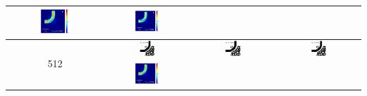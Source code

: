 \begin{table}[ht]
\begin{tabular}{|c|c|c|c|}
      \includegraphics[width=0.33\textwidth]{image/results/bend/PSO/visualize_field_disc_256.png} &
      \includegraphics[width=0.33\textwidth]{image/results/bend/PSO/visualize_field_fab_256.png} \\
    \hline
      \multirow{2}{*}{512} &
      \includegraphics[width=0.20\textwidth]{image/results/bend/PSO/visualize_eps_cont_512.png} &
      \includegraphics[width=0.20\textwidth]{image/results/bend/PSO/visualize_eps_disc_512.png} &
      \includegraphics[width=0.20\textwidth]{image/results/bend/PSO/visualize_eps_fab_512.png} \\
      \cline{2-4}
      &
      \includegraphics[width=0.33\textwidth]{image/results/bend/PSO/visualize_field_cont_512.png} &

\end{tabular}
\end{table}

